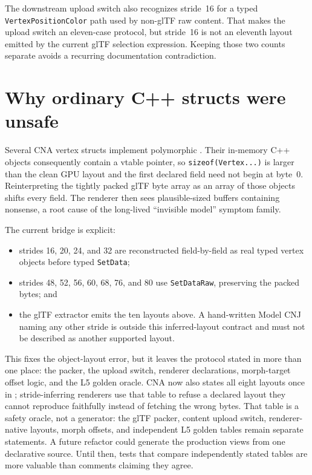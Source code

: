 The downstream upload switch also recognizes stride~16 for a typed
\texttt{VertexPositionColor} path used by non-glTF raw content. That makes the upload switch an
eleven-case protocol, but stride~16 is not an eleventh layout emitted by the current glTF
selection expression. Keeping those two counts separate avoids a recurring documentation
contradiction.

\section{Why ordinary C++ structs were unsafe}

Several CNA vertex structs implement polymorphic . Their in-memory C++
objects consequently contain a vtable pointer, so \texttt{sizeof(Vertex...)} is larger than
the clean GPU layout and the first declared field need not begin at byte~0. Reinterpreting the
tightly packed glTF byte array as an array of those objects shifts every field. The renderer
then sees plausible-sized buffers containing nonsense, a root cause of the long-lived
``invisible model'' symptom family.

The current bridge is explicit:

\begin{itemize}
  \item strides 16, 20, 24, and 32 are reconstructed field-by-field as real typed vertex
        objects before typed \texttt{SetData};
  \item strides 48, 52, 56, 60, 68, 76, and 80 use \texttt{SetDataRaw}, preserving the packed
        bytes; and
  \item the glTF extractor emits the ten layouts above. A hand-written Model CNJ naming any other
        stride is outside this inferred-layout contract and must not be described as another
        supported layout.
\end{itemize}

This fixes the object-layout error, but it leaves the protocol stated in more than one place:
the packer, the upload switch, renderer declarations, morph-target offset logic, and the L5
golden oracle. CNA now also states all eight layouts once in
; stride-inferring renderers use that table to refuse a
declared layout they cannot reproduce faithfully instead of fetching the wrong bytes. That table
is a safety oracle, not a generator: the glTF packer, content upload switch, renderer-native
layouts, morph offsets, and independent L5 golden tables remain separate statements. A future
refactor could generate the production views from one declarative source. Until then, tests that
compare independently stated tables are more valuable than comments claiming they agree.

